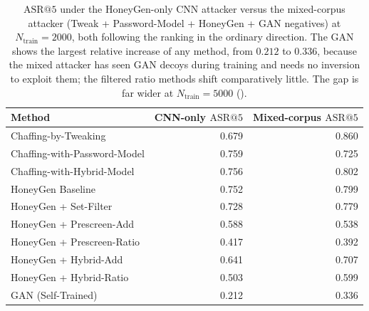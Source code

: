 \begin{table}[t]
  \centering
  \begin{tabular}{lrr}
    \toprule
    \textbf{Method} & CNN-only $\mathrm{ASR}@5$ & Mixed-corpus $\mathrm{ASR}@5$ \\
    \midrule
    Chaffing-by-Tweaking & 0.679 & 0.860 \\
    Chaffing-with-Password-Model & 0.759 & 0.725 \\
    Chaffing-with-Hybrid-Model & 0.756 & 0.802 \\
    HoneyGen Baseline & 0.752 & 0.799 \\
    HoneyGen + Set-Filter & 0.728 & 0.779 \\
    HoneyGen + Prescreen-Add & 0.588 & 0.538 \\
    HoneyGen + Prescreen-Ratio & 0.417 & 0.392 \\
    HoneyGen + Hybrid-Add & 0.641 & 0.707 \\
    HoneyGen + Hybrid-Ratio & 0.503 & 0.599 \\
    GAN (Self-Trained) & 0.212 & 0.336 \\
    \bottomrule
  \end{tabular}
    \caption{$\mathrm{ASR}@5$ under the HoneyGen-only CNN attacker versus
  the mixed-corpus attacker (Tweak + Password-Model + HoneyGen + GAN
  negatives) at $N_{\text{train}}=2000$, both following the ranking in
  the ordinary direction. The GAN shows the largest relative increase of
  any method, from $0.212$ to $0.336$, because the mixed attacker has
  seen GAN decoys during training and needs no inversion to exploit
  them; the filtered ratio methods shift comparatively little. The gap
  is far wider at $N_{\text{train}}=5000$ ().}
  \label{tab:mixed}
\end{table}
